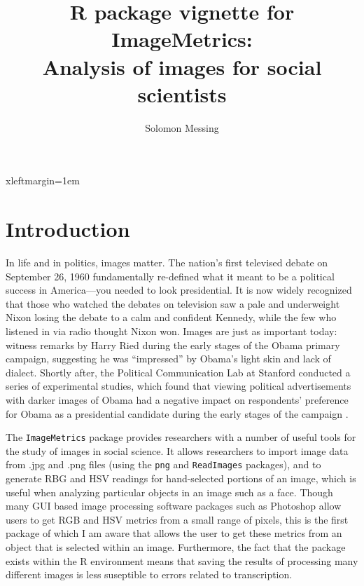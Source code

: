 \documentclass[12pt]{article}
\begin{document}
  
\title{R package vignette for ImageMetrics:\\ Analysis of images for social scientists}
\author{Solomon Messing}

\maketitle

\def\Sweavesize{\smallsize}
 {xleftmargin=1em}



\tableofcontents

\section{Introduction}

In life and in politics, images matter.  The nation's first televised debate on September 26, 1960 fundamentally re-defined what it meant to be a political success in America---you needed to look presidential.  It is now widely recognized that those who watched the debates on television saw a pale and underweight Nixon losing the debate to a calm and confident Kennedy, while the few who listened in via radio thought Nixon won.  Images are just as important today: witness remarks by Harry Ried during the early stages of the Obama primary campaign, suggesting he was ``impressed'' by Obama's light skin and lack of dialect.  Shortly after, the Political Communication Lab at Stanford conducted a series of experimental studies, which found that viewing political advertisements with darker images of Obama had a negative impact on respondents' preference for Obama as a presidential candidate during the early stages of the campaign \citep{iyengar2010explicit}.     

The \texttt{ImageMetrics} package provides researchers with a number of useful tools for the study of images in social science.  It allows researchers to import image data from .jpg and .png files (using the \texttt{png} and \texttt{ReadImages} packages), and to generate RBG and HSV readings for hand-selected portions of an image, which is useful when analyzing particular objects in an image such as a face.  Though many GUI based image processing software packages such as Photoshop allow users to get RGB and HSV metrics from a small range of pixels, this is the first package of which I am aware that allows the user to get these metrics from an object that is selected within an image.  Furthermore, the fact that the package exists within the R environment means that saving the results of processing many different images is less suseptible to errors related to transcription.  
\end{document}
